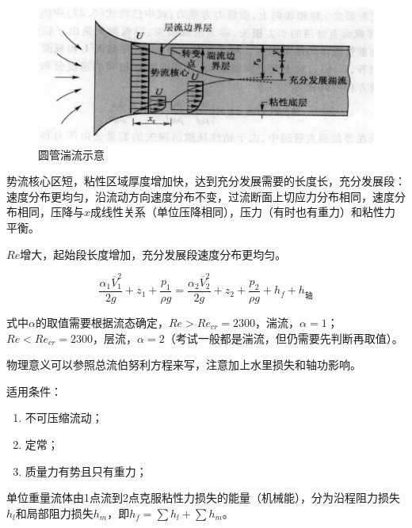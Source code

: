 

\begin{figure}[H]
	\centering
	\includegraphics[scale=0.3]{figures/圆管湍流.png}
	\caption{圆管湍流示意}
\end{figure}

势流核心区短，粘性区域厚度增加快，达到充分发展需要的长度长，充分发展段：速度分布更均匀，沿流动方向速度分布不变，过流断面上切应力分布相同，速度分布相同，压降与$x$成线性关系（单位压降相同），压力（有时也有重力）和粘性力平衡。

$Re$增大，起始段长度增加，充分发展段速度分布更均匀。


\begin{equation}
	\dfrac{\alpha_1 \overline{V}_1^2}{2g} + z_1 + \dfrac{p_1}{\rho g} = \dfrac{\alpha_2 \overline{V}_2^2}{2g} + z_2 + \dfrac{p_2}{\rho g} + h_f + h_{\text{轴}}
\end{equation}

式中$\alpha$的取值需要根据流态确定，$Re > Re_{cr} = 2300$，湍流，$\alpha = 1$；$Re < Re_{cr} = 2300$，层流，$\alpha = 2$（考试一般都是湍流，但仍需要先判断再取值）。

物理意义可以参照总流伯努利方程来写，注意加上水里损失和轴功影响。

适用条件：

\begin{enumerate}
	\item 不可压缩流动；
	\item 定常；
	\item 质量力有势且只有重力；
\end{enumerate}


\begin{definition}[水力损失$h_f$]
	单位重量流体由1点流到2点克服粘性力损失的能量（机械能），分为沿程阻力损失$h_l$和局部阻力损失$h_m$，即$h_f = \sum h_l + \sum h_m$。
\end{definition}

